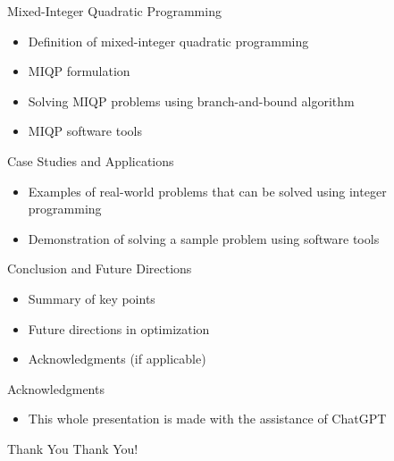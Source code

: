 \documentclass{beamer}
\begin{document}
\begin{frame}{Mixed-Integer Quadratic Programming}
    \begin{itemize}
        \item Definition of mixed-integer quadratic programming
        \item MIQP formulation
        \item Solving MIQP problems using branch-and-bound algorithm
        \item MIQP software tools
    \end{itemize}
\end{frame}

\begin{frame}{Case Studies and Applications}
    \begin{itemize}
        \item Examples of real-world problems that can be solved using integer programming
        \item Demonstration of solving a sample problem using software tools
    \end{itemize}
\end{frame}

\begin{frame}{Conclusion and Future Directions}
    \begin{itemize}
        \item Summary of key points
        \item Future directions in optimization
        \item Acknowledgments (if applicable)
    \end{itemize}
\end{frame}

\begin{frame}{Acknowledgments}
    \begin{itemize}
        \item This whole presentation is made with the assistance of ChatGPT
    \end{itemize}
\end{frame}

\begin{frame}{Thank You}
    \centering
    \Huge Thank You!
\end{frame}
\end{document}
